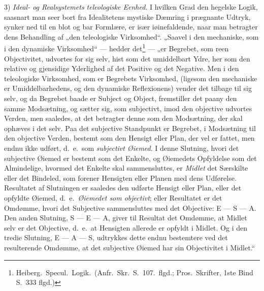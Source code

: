 \documentclass[12pt]{book}
\newcommand{\opage}[1]{\marginnote{\footnotesize\textit{[#1]}}}
\begin{document}
3) \emph{Ideal- og Realsystemets teleologiske Eenhed}. I hvilken Grad den hegelske Logik, saasnart
man seer bort fra Idealitetens mystiske Dæmring i prægnante Udtryk, synker ned til en blot og bar
Formlære, er især iøinefaldende, naar man betragter dens Behandling af „den teleologiske
Virksomhed“. „Saavel i den mechaniske, som i den dynamiske Virksomhed“ --- hedder
det\footnote{Heiberg.\ Specul.\ Logik.\ (Anfr.\ Skr.\ S.~107.\ flgd.; Pros.\ Skrifter, 1ste Bind
S.~333 flgd.)} --- „er Begrebet, som reen Objectivitet, udvortes for sig selv, hist som det
umiddelbart Ydre, her som den relative og gjensidige Yderlighed af det Positive og det Negative.
Men i den teleologiske Virksomhed, som er Begrebets Virksomhed, (ligesom den mechaniske er
Umiddelbarhedens, og den dynamiske Reflexionens) vender det tilbage til sig selv, og da Begrebet
baade er Subject og Object, fremstiller det paany den samme Modsætning, og sætter sig, som
subjectivt, imod den objective udvortes Verden,
\opage{225} men saaledes, at det betragter denne som den Modsætning, der skal ophæves i det selv. Paa det
subjective Standpunkt er Begrebet, i Modsætning til den objective Verden, bestemt som den Hensigt
eller Plan, der vel er fattet, men endnu ikke udført, d.\ e.\ som \emph{subjectivt Øiemed}. I denne
Slutning, hvori det subjective Øiemed er bestemt som det Enkelte, og Øiemedets Opfyldelse som det
Almindelige, hvormed det Enkelte skal sammensluttes, er \emph{Midlet} det Særskilte eller det
Bindeled, som forener Hensigten eller Planen med dens Udførelse. Resultatet af Slutningen er
saaledes den udførte Hensigt eller Plan, eller det opfyldte Øiemed, d.\ e.\ \emph{Øiemedet som
objectivt}; eller Resultatet er det Omdømme, hvori det Subjective sammensluttes med det Objective:
E --- S --- A. Den anden Slutning, S --- E --- A, giver til Resultat det Omdømme, at Midlet selv er
det Objective, d.\ e.\ at Hensigten allerede er opfyldt i Midlet. Og i den tredie Slutning,
E --- A --- S, udtrykkes dette endnu bestemtere ved det resulterende Omdømme, at det subjective
Øiemed har sin Objectivitet i Midlet.“
\end{document}
